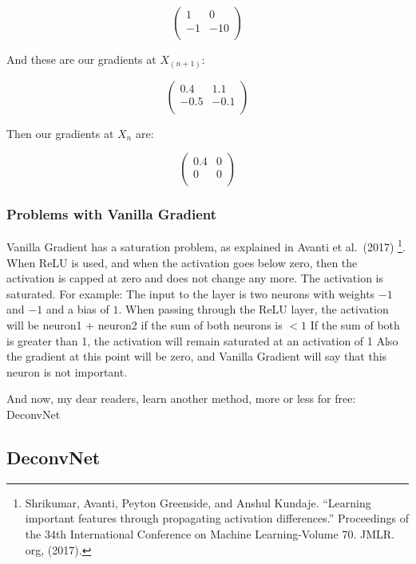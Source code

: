 \documentclass[
  11pt,
]{scrbook}
\begin{document}
\[
\begin{pmatrix}
1 & 0 \\
-1 & -10 \\
\end{pmatrix}
\]

And these are our gradients at \(X_{(n+1)}\):

\[
\begin{pmatrix}
0.4 & 1.1 \\
-0.5 & -0.1  \\
\end{pmatrix}
\]

Then our gradients at \(X_n\) are:

\[
\begin{pmatrix}
0.4 & 0 \\
 0 & 0  \\
\end{pmatrix}
\]

\hypertarget{problems-with-vanilla-gradient}{%
\subsubsection{Problems with Vanilla Gradient}\label{problems-with-vanilla-gradient}}

Vanilla Gradient has a saturation problem, as explained in Avanti et al.~(2017) \footnote{Shrikumar, Avanti, Peyton Greenside, and Anshul Kundaje. ``Learning important features through propagating activation differences.'' Proceedings of the 34th International Conference on Machine Learning-Volume 70. JMLR. org, (2017).}.
When ReLU is used, and when the activation goes below zero, then the activation is capped at zero and does not change any more.
The activation is saturated.
For example: The input to the layer is two neurons with weights \(-1\) and \(-1\) and a bias of \(1\).
When passing through the ReLU layer, the activation will be neuron1 + neuron2 if the sum of both neurons is \(<1\)
If the sum of both is greater than 1, the activation will remain saturated at an activation of 1
Also the gradient at this point will be zero, and Vanilla Gradient will say that this neuron is not important.

And now, my dear readers, learn another method, more or less for free: DeconvNet

\hypertarget{deconvnet}{%
\subsection{DeconvNet}\label{deconvnet}}
\end{document}
